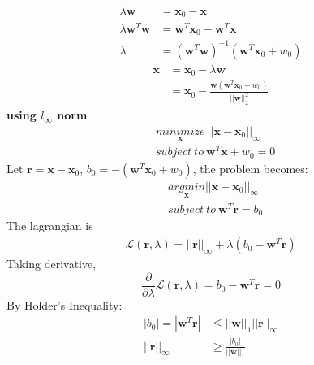 \documentclass[11pt]{article}
\begin{document}
\begin{equation}
\begin{split}
\lambda\pmb{w}&=\pmb{x}_0 - \pmb{x}\\
\lambda\pmb{w}^T\pmb{w} &= \pmb{w}^T\pmb{x}_0-\pmb{w}^T\pmb{x}\\
\lambda &= \left(\pmb{w}^T\pmb{w}\right)^{-1}(\pmb{w}^T\pmb{x}_0+w_0)
\end{split}
\end{equation}
\begin{equation}
\begin{split}
\pmb{x} &= \pmb{x}_0-\lambda\pmb{w}\\
&=\pmb{x}_0-\frac{\pmb{w}(\pmb{w}^T\pmb{x}_0+w_0)}{||\pmb{w}||_2^2}
\end{split}
\end{equation}
\noindent\textbf{using $l_\infty$ norm}\\
\begin{equation}
\begin{split}
&\underset{\pmb{x}}{minimize}\ ||\pmb{x} - \pmb{x}_0||_{\infty}\\
&subject\ to\ \pmb{w}^T\pmb{x} + w_0 = 0
\end{split}
\end{equation}
Let $\pmb{r} = \pmb{x} - \pmb{x}_0$, $b_0 = -(\pmb{w}^T\pmb{x}_0+w_0)$, the problem becomes:
\begin{equation}
\begin{split}
&\underset{\pmb{x}}{argmin}||\pmb{x}-\pmb{x}_0||_\infty\\
&subject\ to\ \pmb{w}^T\pmb{r}=b_0
\end{split}
\end{equation}
The lagrangian is
\begin{equation}
\begin{split}
\mathcal{L}(\pmb{r},\lambda)=||\pmb{r}||_{\infty}+\lambda(b_0-\pmb{w}^T\pmb{r})
\end{split}
\end{equation}
Taking derivative,
\begin{equation}
\frac{\partial}{\partial\lambda}\mathcal{L}(\pmb{r},\lambda)=b_0-\pmb{w}^T\pmb{r}=0
\end{equation}
By Holder's Inequality:
\begin{equation}
\begin{split}
|b_0|=|\pmb{w}^T\pmb{r}| &\le||\pmb{w}||_1||\pmb{r}||_\infty\\
||\pmb{r}||_\infty&\ge\frac{|b_0|}{||\pmb{w}||_1}
\end{split}
\end{equation}
\end{document}
